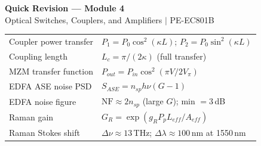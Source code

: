 \documentclass[12pt,a4paper]{article}
\renewcommand{\arraystretch}{1.45}
\begin{document}
\newpage
\begin{center}
  {\large\bfseries\color{myred} Quick Revision --- Module 4}\\[3pt]
  {\small\color{mydark} Optical Switches, Couplers, and Amplifiers $|$ PE-EC801B}
\end{center}
\noindent{\color{myred}\rule{\linewidth}{1.2pt}}
\vspace{4pt}

\begin{tcolorbox}[formulabox, title={\textbf{Key Formulas at a Glance}}]
\renewcommand{\arraystretch}{1.35}
\begin{tabularx}{\linewidth}{B{5.0cm} X}
Coupler power transfer & $P_1 = P_0\cos^2(\kappa L)$; \quad $P_2 = P_0\sin^2(\kappa L)$ \\[4pt]
Coupling length & $L_c = \pi/(2\kappa)$ (full transfer) \\[4pt]
MZM transfer function & $P_{out} = P_{in}\cos^2(\pi V/2V_\pi)$ \\[4pt]
EDFA ASE noise PSD & $S_{ASE} = n_{sp} h\nu(G-1)$ \\[4pt]
EDFA noise figure & $\text{NF} \approx 2n_{sp}$ (large $G$); min $= 3$\,dB \\[4pt]
Raman gain & $G_R = \exp(g_R P_p L_{eff}/A_{eff})$ \\[4pt]
Raman Stokes shift & $\Delta\nu \approx 13$\,THz; \quad $\Delta\lambda \approx 100$\,nm at 1550\,nm \\[4pt]
\end{tabularx}
\end{tcolorbox}
\end{document}
